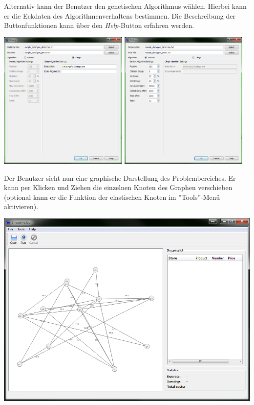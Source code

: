 Alternativ kann der Benutzer den genetischen Algorithmus wählen. Hierbei kann er die Eckdaten des Algorithmenverhaltens bestimmen. Die Beschreibung der Buttonfunktionen kann über den \emph{Help}-Button erfahren werden.

\includegraphics[width=0.48\textwidth]{resourcen/walkthrough/1a-open-clingo.png} \includegraphics[width=0.48\textwidth]{resourcen/walkthrough/1b-open-genetic.png}

\newpage

Der Benutzer sieht nun eine graphische Darstellung des Problembereiches. Er kann per Klicken und Ziehen die einzelnen Knoten des Graphen verschieben (optional kann er die Funktion der elastischen Knoten im ''Tools''-Menü aktivieren).

\includegraphics[width=1\textwidth]{resourcen/walkthrough/2-opened-clingo.png}

